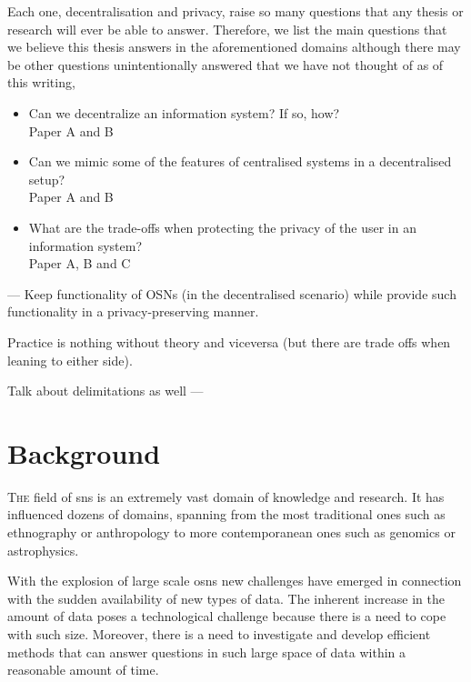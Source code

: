 \documentclass[showtrims]{kthesis}
\begin{document}
Each one, decentralisation and privacy, raise so many questions that any thesis 
or research will ever be able to answer. Therefore, we list the main questions that 
we believe this thesis answers in the aforementioned domains although there may 
be other questions unintentionally answered that we have not thought of as of this 
writing,
\begin{itemize}
	\item Can we decentralize an information system? If so, how?\\
	Paper A and B
	\item Can we mimic some of the features of centralised systems in a decentralised setup?\\
	Paper A and B
	\item What are the trade-offs when protecting the privacy of the user in an information system?\\
	Paper A, B and C
\end{itemize}

---
Keep functionality of OSNs (in the decentralised scenario) while provide such functionality 
in a privacy-preserving manner.

Practice is nothing without theory and viceversa (but there are trade offs when leaning to either side).

Talk about delimitations as well
---

\chapter{Background}
\lettrine{\textcolor[gray]{.25}{T}}{he} field of \acp{sn} is an extremely vast domain of knowledge and research. It 
has influenced dozens of domains, spanning from the most traditional ones such as 
ethnography or anthropology to more contemporanean ones such as genomics or astrophysics.


With the explosion of large scale \acp{osn} new challenges have emerged in connection 
with the sudden availability of new types of data. The inherent increase in the 
amount of data poses a technological challenge because there is a need to cope with 
such size. Moreover, there is a need to investigate and develop efficient methods 
that can answer questions in such large space of data within a reasonable amount 
of time.
\end{document}
